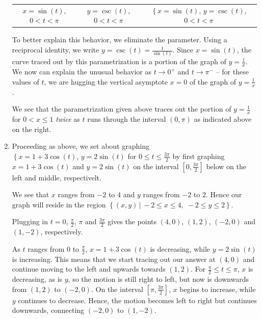 \begin{ex}
\begin{enumerate}
\begin{tabular}{ccc}
{\scriptsize $x = \sin(t)$, $0 < t < \pi$} & {\scriptsize $y = \csc(t)$, $0 < t < \pi$} & {\scriptsize $\left\{ x = \sin(t), \, y = \csc(t) \right.$,  $0 < t < \pi$}  \\

\end{tabular}

 \smallskip

 To better explain this behavior, we eliminate the parameter. Using a reciprocal identity, we  write $y = \csc(t) = \frac{1}{\sin(t)}$.  Since $x =\sin(t)$, the curve traced out by this parametrization is a portion of the graph of $y = \frac{1}{x}$.   We now can explain the unusual behavior as $t \rightarrow 0^{+}$ and $t \rightarrow \pi^{-}$ -- for these values of $t$, we are hugging the vertical asymptote $x=0$ of the graph of $y = \frac{1}{x}$.  
 
 \smallskip
 
 We see that the parametrization given above traces out the portion of $y = \frac{1}{x}$ for $0< x \leq 1$ \textit{twice} as $t$ runs through the interval $(0,\pi)$ as indicated above on the right.



\item  Proceeding as above, we set about graphing $\left\{  x = 1 + 3\cos(t), \,  y =2\sin(t) \right.$ for $0 \leq t \leq \frac{3\pi}{2}$ by first graphing $x = 1 + 3\cos(t)$ and $y = 2\sin(t)$ on the interval $\left[0, \frac{3\pi}{2}\right]$ below on the left and middle, respectivelt.

\smallskip

 We see that $x$ ranges from $-2$ to $4$ and $y$ ranges from $-2$ to $2$.  Hence our graph will reside in the region $\left\{ (x,y) \, | \, -2 \leq x \leq 4, \;  -2 \leq y \leq 2 \right\}$.
 
 \smallskip
 
  Plugging in $t = 0$, $\frac{\pi}{2}$, $\pi$ and $\frac{3\pi}{2}$ gives the points $(4,0)$, $(1,2)$, $(-2,0)$ and $(1,-2)$, respectively.  
  
  \smallskip
  
  As $t$ ranges from $0$ to $\frac{\pi}{2}$, $x = 1 + 3\cos(t)$ is decreasing, while $y = 2\sin(t)$ is increasing.  This means that we start tracing out our answer at $(4,0)$ and continue moving to the left and upwards towards $(1,2)$.    For $\frac{\pi}{2} \leq t \leq \pi$, $x$ is decreasing, as is $y$, so the motion is still right to left, but now is downwards from $(1,2)$ to $(-2,0)$.   On the interval $\left[\pi, \frac{3\pi}{2}\right]$, $x$ begins to increase, while $y$ continues to decrease.  Hence, the motion becomes left to right but continues downwards, connecting $(-2,0)$ to $(1,-2)$. 
  

\end{enumerate}
\end{ex}
